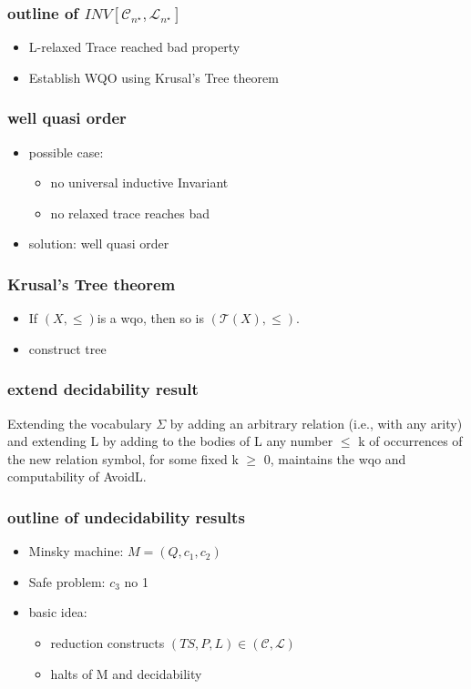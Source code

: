 \begin{frame}
    \frametitle{outline of $INV[\mathcal{C}_{n^{\star}},\mathcal{L}_{n^{\star}}]$}
    \begin{itemize}
        \item L-relaxed Trace reached bad property
        \item Establish WQO using Krusal's Tree theorem
    \end{itemize}
\end{frame}
\begin{frame}
    \frametitle{well quasi order}
    \begin{itemize}
        \item possible case:
        \begin{itemize}
            \item no universal inductive Invariant
            \item no relaxed trace reaches bad
        \end{itemize}
        \item solution: well quasi order
    \end{itemize}
\end{frame}
\begin{frame}
    \frametitle{Krusal's Tree theorem}
    \begin{itemize}
        \item If $(X,\le)$is a wqo, then so is $(\mathcal{T}(X),\le)$.
        \item construct tree
    \end{itemize}
\end{frame}
\begin{frame}
    \frametitle{extend decidability result}
    \begin{corollary}
        Extending the vocabulary $\varSigma $ by adding an arbitrary relation (i.e., with any arity) and extending L by adding to the bodies of L any number $\leqslant $ k of occurrences of the new relation symbol, for some fixed k $\geqslant $ 0, maintains the wqo and computability of AvoidL.
    \end{corollary}
\end{frame}
\begin{frame}
    \frametitle{outline of undecidability results}
    \begin{itemize}
        \item Minsky machine: $M=(Q,c_{1},c_{2})$
        \item Safe problem: $c_3$ no 1
        \item basic idea:
        \begin{itemize}
            \item reduction constructs $(TS,P,L)\in (\mathcal{C},\mathcal{L})$
            \item halts of M and decidability
        \end{itemize}
    \end{itemize}
\end{frame}
